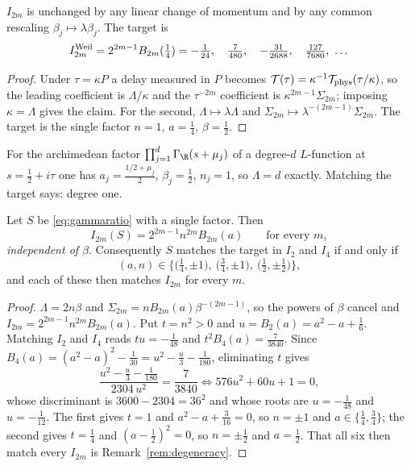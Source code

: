 \begin{proposition}\label{prop:dictfree}
$I_{2m}$ is unchanged by any linear change of momentum and by any common
rescaling $\beta_j\mapsto\lambda\beta_j$. The target is
\[
 I_{2m}^{\rm Weil}=2^{2m-1}B_{2m}(\tfrac14)
 =-\tfrac1{24},\quad\tfrac7{480},\quad-\tfrac{31}{2688},\quad\tfrac{127}{7680},\ \dots
\]
\end{proposition}

\begin{proof}
Under $\tau=\kappa P$ a delay measured in $P$ becomes
$\mathcal T(\tau)=\kappa^{-1}\mathcal T_{\rm phys}(\tau/\kappa)$, so the leading
coefficient is $\Lambda/\kappa$ and the $\tau^{-2m}$ coefficient is
$\kappa^{2m-1}\Sigma_{2m}$; imposing $\kappa=\Lambda$ gives the claim. For the
second, $\Lambda\mapsto\lambda\Lambda$ and
$\Sigma_{2m}\mapsto\lambda^{-(2m-1)}\Sigma_{2m}$. The target is the single factor
$n=1$, $a=\frac14$, $\beta=\frac12$.
\end{proof}

\begin{corollary}\label{cor:degree}
For the archimedean factor $\prod_{j=1}^d\Gamma_\R(s+\mu_j)$ of a degree-$d$
$L$-function at $s=\frac12+i\tau$ one has $a_j=\frac{1/2+\mu_j}2$,
$\beta_j=\frac12$, $n_j=1$, so $\Lambda=d$ exactly. Matching the target says:
degree one.
\end{corollary}

\begin{theorem}\label{thm:onefactor}
Let $S$ be \eqref{eq:gammaratio} with a single factor. Then
\[
 I_{2m}(S)=2^{2m-1}n^{2m}B_{2m}(a)\qquad\text{for every }m,
\]
\emph{independent of $\beta$}. Consequently $S$ matches the target in $I_2$ and
$I_4$ if and only if
\[
 (a,n)\in\Big\{\big(\tfrac14,\pm1\big),\ \big(\tfrac34,\pm1\big),\
 \big(\tfrac12,\pm\tfrac12\big)\Big\},
\]
and each of these then matches $I_{2m}$ for every $m$.
\end{theorem}

\begin{proof}
$\Lambda=2n\beta$ and $\Sigma_{2m}=nB_{2m}(a)\beta^{-(2m-1)}$, so the powers of
$\beta$ cancel and $I_{2m}=2^{2m-1}n^{2m}B_{2m}(a)$. Put $t=n^2>0$ and
$u=B_2(a)=a^2-a+\frac16$. Matching $I_2$ and $I_4$ reads $tu=-\frac1{48}$ and
$t^2B_4(a)=\frac7{3840}$. Since $B_4(a)=(a^2-a)^2-\frac1{30}=u^2-\frac u3-\frac1{180}$,
eliminating $t$ gives
\[
 \frac{u^2-\frac u3-\frac1{180}}{2304\,u^2}=\frac7{3840}
 \iff 576u^2+60u+1=0,
\]
whose discriminant is $3600-2304=36^2$ and whose roots are $u=-\frac1{48}$ and
$u=-\frac1{12}$. The first gives $t=1$ and $a^2-a+\frac3{16}=0$, so $n=\pm1$ and
$a\in\{\frac14,\frac34\}$; the second gives $t=\frac14$ and $(a-\frac12)^2=0$, so
$n=\pm\frac12$ and $a=\frac12$. That all six then match every $I_{2m}$ is
Remark~\ref{rem:degeneracy}.
\end{proof}

